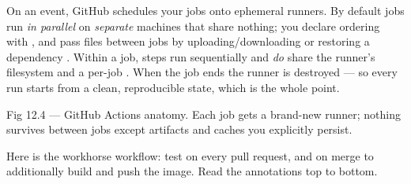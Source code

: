  On an event, GitHub schedules your jobs onto ephemeral runners. By default jobs run \emph{in parallel} on \emph{separate} machines that share nothing; you declare ordering with , and pass files between jobs by uploading/downloading  or restoring a dependency . Within a job, steps run sequentially and \emph{do} share the runner's filesystem and a per-job . When the job ends the runner is destroyed --- so every run starts from a clean, reproducible state, which is the whole point.

\begin{wbfigure}{Fig 12.4 --- GitHub Actions anatomy. Each job gets a brand-new runner; nothing survives between jobs except artifacts and caches you explicitly persist.}
\end{wbfigure}

 Here is the workhorse workflow: test on every pull request, and on merge to  additionally build and push the image. Read the annotations top to bottom.

